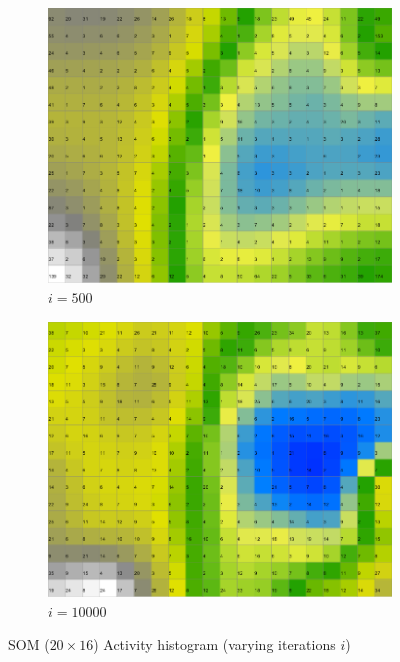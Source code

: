 \documentclass{acm_proc_article-sp}
\begin{document}
\begin{figure}
\begin{subfigure}[b]{0.24\linewidth}
    \end{subfigure}
    \begin{subfigure}[b]{0.24\linewidth}
        \includegraphics[width=\linewidth]{img/wine-newmid-activity-histogram-i-500}
        \caption{$i=500$}
        \label{fig:wine-newmid-activity-histogram-i-500}
    \end{subfigure}
    \begin{subfigure}[b]{0.24\linewidth}
        \includegraphics[width=\linewidth]{img/wine-newmid-activity-histogram-i-10000}
        \caption{$i=10000$}
        \label{fig:wine-newmid-activity-histogram-i-10000}
    \end{subfigure}
    \caption{SOM ($20\times16$) Activity histogram (varying iterations $i$)}
    \label{fig:wine-newmid-activity-histogram-i}
\end{figure}
\end{document}
